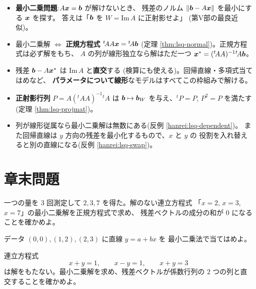 \begin{matome}
\begin{itemize}
\item \textbf{最小二乗問題}:$A\bm{x} = \bm{b}$ が解けないとき、
残差のノルム $\|\bm{b} - A\bm{x}\|$ を最小にする $\bm{x}$ を探す。
答えは「$\bm{b}$ を $W = \mathrm{Im}\,A$ に正射影せよ」
(第V部の最良近似)。
\item 最小二乗解 $\iff$ \textbf{正規方程式} ${}^t\!AA\bm{x} = {}^t\!A\bm{b}$
(定理 \ref{thm:lsq-normal})。正規方程式は必ず解をもち、
$A$ の列が線形独立なら解はただ一つ
$\bm{x}^* = ({}^t\!AA)^{-1}{}^t\!A\bm{b}$。
\item 残差 $\bm{b} - A\bm{x}^*$ は $\mathrm{Im}\,A$ と\textbf{直交}する
(検算にも使える)。回帰直線・多項式当てはめなど、
\textbf{パラメータについて線形}なモデルはすべてこの枠組みで解ける。
\item \textbf{正射影行列} $P = A({}^t\!AA)^{-1}{}^t\!A$ は
$\bm{b} \mapsto \bm{b}_W$ を与え、${}^t\!P = P$, $P^2 = P$ を満たす
(定理 \ref{thm:lsq-projmat})。
\item 列が線形従属なら最小二乗解は無数にある(反例 \ref{hanrei:lsq-dependent})。
また回帰直線は $y$ 方向の残差を最小化するもので、$x$ と $y$ の
役割を入れ替えると別の直線になる(反例 \ref{hanrei:lsq-swap})。
\end{itemize}
\end{matome}

\section*{章末問題}

\begin{mondai}[基本]\label{q:lsq-ex1}
一つの量を $3$ 回測定して $2, 3, 7$ を得た。解のない連立方程式
「$x = 2$, $x = 3$, $x = 7$」の最小二乗解を正規方程式で求め、
残差ベクトルの成分の和が $0$ になることを確かめよ。
\end{mondai}

\begin{mondai}[基本]\label{q:lsq-ex2}
データ $(0, 0), (1, 2), (2, 3)$ に直線 $y = a + bx$ を
最小二乗法で当てはめよ。
\end{mondai}

\begin{mondai}[基本]\label{q:lsq-ex3}
連立方程式
\[
x + y = 1, \qquad x - y = 1, \qquad x + y = 3
\]
は解をもたない。最小二乗解を求め、残差ベクトルが係数行列の
$2$ つの列と直交することを確かめよ。
\end{mondai}

